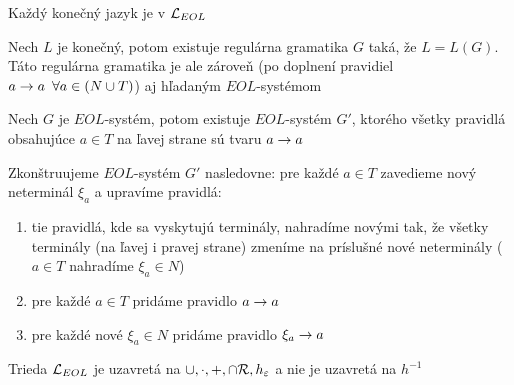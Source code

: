 \begin{veta}
  Každý konečný jazyk je v $\mathcal{L}_{EOL}$
\end{veta}

\begin{dokaz}
  Nech $L$ je konečný, potom existuje regulárna gramatika $G$ taká,
  že $L=L(G)$. Táto regulárna gramatika je ale zároveň (po doplnení
  pravidiel $a\rightarrow a\enspace\forall a\in(N\cup T)$) aj hľa\-da\-ným
  $EOL$-systémom
\end{dokaz}

\begin{lema}
  \label{norm_tvarEOL} Nech $G$ je $EOL$-systém, potom existuje
  $EOL$-systém $G'$, ktorého všetky pravidlá obsahujúce $a\in T$ na
  ľavej strane sú tvaru $a\rightarrow a$
\end{lema}

\begin{dokaz}
  Zkonštruujeme $EOL$-systém $G'$ nasledovne: pre každé $a\in T$
  zavedieme nový neterminál $\xi_{a}$ a upravíme pravidlá:
  \begin{enumerate}
    \item tie pravidlá, kde sa vyskytujú terminály, nahradíme novými tak,
    že všetky terminály (na ľavej i pravej strane) zmeníme na
    príslušné nové neterminály ($a\in T$ nahradíme $\xi_{a}\in N$)
    \item pre každé $a\in T$ pridáme pravidlo $a\rightarrow a$
    \item pre každé nové $\xi_{a}\in N$ pridáme pravidlo $\xi_{a}\rightarrow a$
  \end{enumerate}
\end{dokaz}

\begin{veta}
  Trieda $\mathcal{L}_{EOL}$ je uzavretá na
  $\cup,\cdot,+,\cap\mathcal{R},h_{\varepsilon}$ a nie je uzavretá
  na $h^{-1}$
\end{veta}

